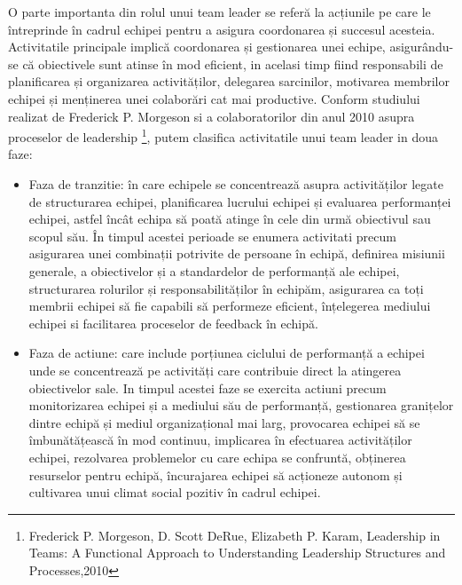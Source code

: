 \documentclass[a4paper, 12pt]{article}
\begin{document}
	\quad\space O parte importanta din rolul unui team leader se referă la acțiunile pe care le întreprinde în cadrul echipei pentru a asigura coordonarea și succesul acesteia. Activitatile principale implică coordonarea și gestionarea unei echipe, asigurându-se că obiectivele sunt atinse în mod eficient, in acelasi timp fiind responsabili de planificarea și organizarea activităților, delegarea sarcinilor, motivarea membrilor echipei și menținerea unei colaborări cat mai  productive. Conform studiului realizat de Frederick P. Morgeson si a colaboratorilor din anul 2010 asupra proceselor de leadership \footnote{Frederick P. Morgeson, D. Scott DeRue, Elizabeth P. Karam, Leadership in Teams: A Functional Approach to Understanding Leadership Structures and Processes,2010}, putem clasifica activitatile unui team leader in doua faze: 
	\begin{itemize}

	\item Faza de tranzitie: în care echipele se concentrează asupra activităților legate de structurarea echipei, planificarea lucrului echipei și evaluarea performanței echipei, astfel încât echipa să poată atinge în cele din urmă obiectivul sau scopul său. În timpul acestei perioade  se enumera activitati precum asigurarea unei combinații potrivite de persoane în echipă, definirea misiunii generale, a obiectivelor și a standardelor de performanță ale echipei, structurarea rolurilor și responsabilităților în echipăm, asigurarea ca toți membrii echipei să fie capabili să performeze eficient, înțelegerea mediului echipei si facilitarea proceselor de feedback în echipă. 

	\item Faza de actiune: care include porțiunea ciclului de performanță a echipei unde se concentrează pe activități care contribuie direct la atingerea obiectivelor sale. In timpul acestei faze se exercita actiuni precum monitorizarea echipei și a mediului său de performanță, gestionarea granițelor dintre echipă și mediul organizațional mai larg, provocarea echipei să se îmbunătățească în mod continuu, implicarea în efectuarea activităților echipei, rezolvarea problemelor cu care echipa se confruntă, obținerea resurselor pentru echipă, încurajarea echipei să acționeze autonom și cultivarea unui climat social pozitiv în cadrul echipei. 
	\end{itemize}

\quad\space 

\end{document}
